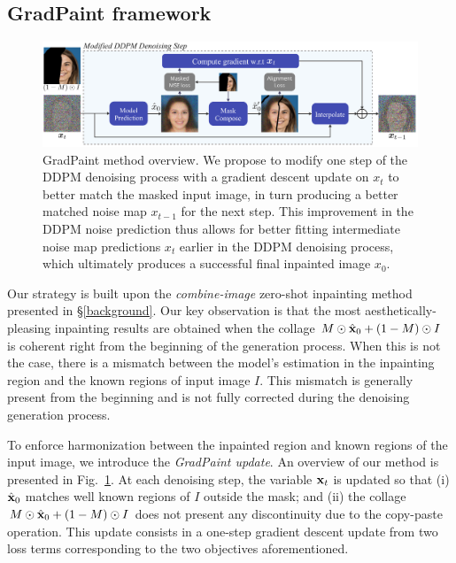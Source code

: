 \subsection{GradPaint framework}

\begin{figure}[h]
  \centering
    \includegraphics[width=\textwidth]{images/gradpaint/method.pdf}
    \caption{GradPaint method overview. We propose to modify one step of the DDPM denoising process with a gradient descent update on $x_t$ to better match the masked input image, in turn producing a better matched noise map $x_{t-1}$ for the next step. This improvement in the DDPM noise prediction thus allows for better fitting intermediate noise map predictions $x_t$ earlier in the DDPM denoising process, which ultimately produces a successful final inpainted image $x_0$.}
    \label{fig:method}
\end{figure}


Our strategy is built upon the \textit{combine-image} zero-shot inpainting method presented in \S\ref{background}.
 Our key observation is that the most aesthetically-pleasing inpainting results are obtained when the 
 collage $M \odot \hat{\mathbf{x}}_0 + (1-M) \odot I$ is coherent right from the beginning of the generation process.
  When this is not the case, there is a mismatch between the model's estimation in the inpainting region and 
  the known regions of input image $I$. This mismatch is generally present from the beginning and is not fully 
  corrected during the denoising generation process. 

To enforce harmonization between the inpainted region and known regions of the input image, we introduce the 
\textit{GradPaint update}. An overview of our method is presented in Fig.~\ref{fig:method}.
At each denoising step, the variable $\mathbf{x}_t$ is updated so that (i) $\hat{\mathbf{x}}_0$ matches well known regions of 
$I$ outside the mask; and (ii) the collage $M \odot \hat{\mathbf{x}}_0 + (1-M) \odot I$ does not present any discontinuity 
due to the copy-paste operation. This update consists in a one-step gradient descent update from two loss terms
 corresponding to the two objectives aforementioned.


